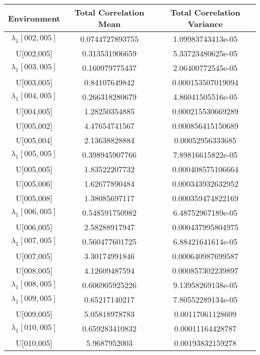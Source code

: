 \begin{table}[ht!]
\begin{tabular}{|c|c|c|}
\hline
Environment & Total Correlation Mean& Total Correlation Variance\\
\hline
\hline
$\lambda_{1}[002,005]$ &0.0744727893755&1.09983743413e-05\\
U[002,005] &0.313531906659&5.33723480625e-05\\
$\lambda_{1}[003,005]$ &0.160979775437&2.06400772545e-05\\
U[003,005] &0.84107649842&0.000153507019094\\
$\lambda_{1}[004,005]$ &0.266318280679&4.86041505516e-05\\
U[004,005] &1.28250354885&0.000215530669289\\
U[005,002] &4.47654741567&0.000856415150689\\
U[005,004] &2.13638828884&0.00052956333685\\
$\lambda_{1}[005,005]$ &0.398945907766&7.89816615822e-05\\
U[005,005] &1.83522207732&0.000408575106664\\
U[005,006] &1.62677890484&0.000343932632952\\
U[005,008] &1.38085697117&0.000359474822169\\
$\lambda_{1}[006,005]$ &0.548591750982&6.48752967189e-05\\
U[006,005] &2.58288917947&0.000437995804975\\
$\lambda_{1}[007,005]$ &0.560477601725&6.88421641614e-05\\
U[007,005] &3.30174991846&0.000640987699587\\
U[008,005] &4.12609487594&0.000857302239897\\
$\lambda_{1}[008,005]$ &0.606905925226&9.13958269138e-05\\
$\lambda_{1}[009,005]$ &0.65217140217&7.80552289134e-05\\
U[009,005] &5.05818978783&0.00117061128609\\
$\lambda_{1}[010,005]$ &0.659283410832&0.00011164428787\\
U[010,005] &5.9687952003&0.00193832159278\\
\hline
\end{tabular}
\end{table}

